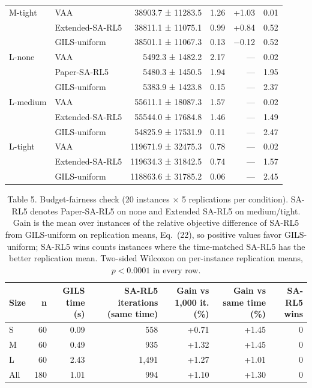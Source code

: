 \documentclass[10pt,a4paper]{article}
\begin{document}
\begin{table}[H]
\begin{tabular}{@{}llrrrr@{}}
M-tight & VAA & 38903.7 ± 11283.5 & 1.26 & +1.03 & 0.01\\
 & Extended-SA-RL5 & 38811.1 ± 11075.1 & 0.99 & +0.84 & 0.52\\
 & GILS-uniform & 38501.1 ± 11067.3 & 0.13 & $-$0.12 & 0.52\\
L-none & VAA & 5492.3 ± 1482.2 & 2.17 & --- & 0.02\\
 & Paper-SA-RL5 & 5480.3 ± 1450.5 & 1.94 & --- & 1.95\\
 & GILS-uniform & 5383.9 ± 1423.8 & 0.15 & --- & 2.37\\
L-medium & VAA & 55611.1 ± 18087.3 & 1.57 & --- & 0.02\\
 & Extended-SA-RL5 & 55544.0 ± 17684.8 & 1.46 & --- & 1.49\\
 & GILS-uniform & 54825.9 ± 17531.9 & 0.11 & --- & 2.47\\
L-tight & VAA & 119671.9 ± 32475.3 & 0.78 & --- & 0.02\\
 & Extended-SA-RL5 & 119634.3 ± 31842.5 & 0.74 & --- & 1.57\\
 & GILS-uniform & 118863.6 ± 31785.2 & 0.06 & --- & 2.45\\
\bottomrule
\end{tabular}
\end{table}
\vspace{\baselineskip}

\begin{table}[H]\centering
\caption{Table 5. Budget-fairness check (20 instances $\times$ 5 replications per condition). SA-RL5 denotes Paper-SA-RL5 on none and Extended SA-RL5 on medium/tight. Gain is the mean over instances of the relative objective difference of SA-RL5 from GILS-uniform on replication means, Eq.~(22), so positive values favor GILS-uniform; SA-RL5 wins counts instances where the time-matched SA-RL5 has the better replication mean. Two-sided Wilcoxon on per-instance replication means, $p<0.0001$ in every row.}
\label{tab:fair}\small
\begin{tabular}{@{}lrrrrrr@{}}
\toprule
Size & n & \shortstack{GILS\\time (s)} & \shortstack{SA-RL5 iterations\\(same time)} & \shortstack{Gain vs\\1,000 it. (\%)} & \shortstack{Gain vs\\same time (\%)} & \shortstack{SA-RL5\\wins}\\
\midrule
S & 60 & 0.09 & 558 & +0.71 & +1.45 & 0\\
M & 60 & 0.49 & 935 & +1.32 & +1.45 & 0\\
L & 60 & 2.43 & 1,491 & +1.27 & +1.01 & 0\\
\midrule
All & 180 & 1.01 & 994 & +1.10 & +1.30 & 0\\
\bottomrule
\end{tabular}
\end{table}
\end{document}
